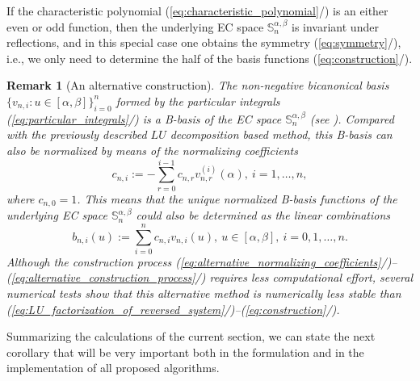 \documentclass[b5paper, twosided]{book}
\newtheorem{remark}{Remark}[chapter]
\DeclareRobustCommand{\mref}[1]{\ref{#1}{\relsize{-1}/\pageref{#1}}}
\begin{document}
If the characteristic polynomial (\mref{eq:characteristic_polynomial}) is an either even or odd function, then the underlying EC space $\mathbb{S}_{n}^{\alpha,\beta}$ is invariant under reflections, and in this special case one obtains the symmetry (\mref{eq:symmetry}), i.e., we only need to determine the half of the basis functions
(\mref{eq:construction}). 

\begin{remark}[An alternative construction]The non-negative bicanonical basis $\big\{v_{n,i}:u\in[\alpha,\allowbreak{}\beta]\big\}_{i=0}^{n}$ formed by the particular integrals (\mref{eq:particular_integrals}) is a B-basis of the EC space $\mathbb{S}_n^{\alpha,\beta}$ (see \cite[Theorem 2.4/(ii)]{CarnicerMainarPena2004}). Compared with the previously described $LU$ decomposition based method, this B-basis can also be normalized by means of the normalizing coefficients
    \begin{equation}
    c_{n,i}:=-\sum_{r=0}^{i-1} c_{n,r} v_{n,r}^{\left(i\right)}\left(\alpha\right),~i=1,\ldots,n,
    \label{eq:alternative_normalizing_coefficients}
    \end{equation}
    where $c_{n,0}=1$. This means that the unique normalized B-basis functions of the underlying EC space $\mathbb{S}_{n}^{\alpha,\beta}$ could also be determined as the linear combinations
    \begin{equation}
    b_{n,i}\left(u\right) := \sum_{i=0}^{n} c_{n,i} v_{n,i}\left(u\right),~u \in \left[\alpha,\beta\right],~i=0,1,\ldots,n.
    \label{eq:alternative_construction_process}
    \end{equation}
    Although the construction process (\mref{eq:alternative_normalizing_coefficients})--(\mref{eq:alternative_construction_process}) requires less computational effort, several numerical tests show that this alternative method is numerically less stable than (\mref{eq:LU_factorization_of_reversed_system})--(\mref{eq:construction}). 
\end{remark}

Summarizing the calculations of the current section, we can state the next corollary that will be very important both in the formulation and in the implementation of all proposed algorithms.
\end{document}
